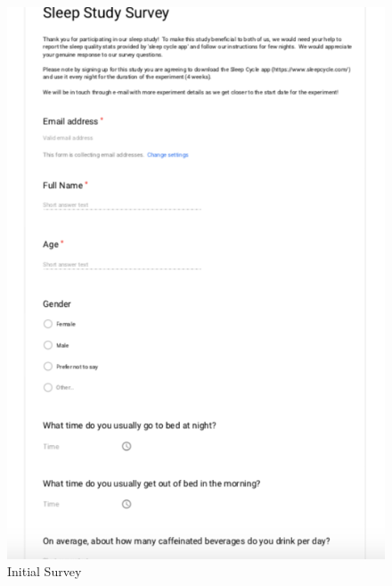 \documentclass[12pt,]{article}
\begin{document}
\begin{figure}[H]

{\centering \includegraphics[width=0.8\linewidth]{img/initial_survey_1} 

}

\caption{Initial Survey}\label{fig:unnamed-chunk-7}
\end{figure}
\end{document}
